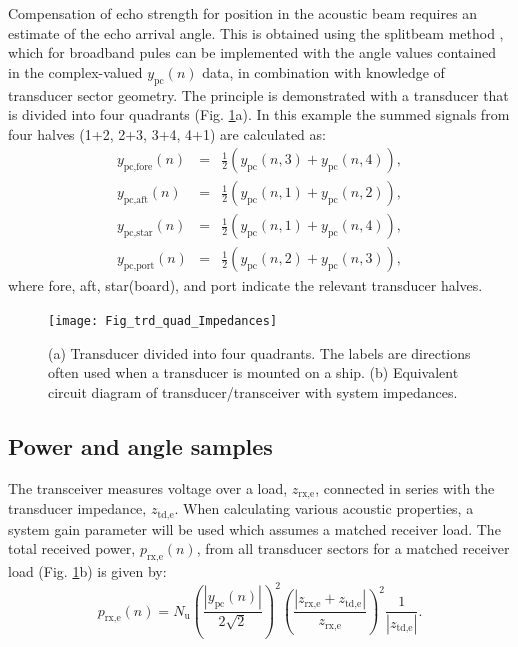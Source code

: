 \documentclass[preprint,12pt,TurnOnLineNumbers]{JASAnew}
\newcommand{\samplesymt}{n}
\newcommand{\nchannels}{N_{\textrm{u}}}
\newcommand{\zrxe}{z_{\textrm{rx,e}}}
\newcommand{\ztde}{z_{\textrm{td,e}}}
\newcommand{\prxe}{p_{\textrm{rx,e}}}
\newcommand{\ypc}{y_{\textrm{pc}}}
\begin{document}
Compensation of echo strength for position in the acoustic beam requires an estimate of the echo arrival angle. This is obtained using the splitbeam method \citep{burdic1991}, which for broadband pules can be implemented with the angle values contained in the complex-valued $\ypc(\samplesymt)$ data, in combination with knowledge of transducer sector geometry. The principle is demonstrated with a transducer that is divided into four quadrants (Fig. \ref{fi:Fig_trd_quad_Impedances}a). In this example the summed signals from four halves (1+2, 2+3, 3+4, 4+1) are calculated as:
\begin{eqnarray}
\label{eq:SumHalves}
y_{\textrm{pc,fore}}(\samplesymt) & = & \frac{1}{2} \left( \ypc(\samplesymt,3)+\ypc(\samplesymt,4) \right),\\
y_{\textrm{pc,aft}}(\samplesymt) & = & \frac{1}{2} \left( \ypc(\samplesymt,1)+\ypc(\samplesymt,2) \right),\\
y_{\textrm{pc,star}}(\samplesymt) & = & \frac{1}{2} \left( \ypc(\samplesymt,1)+\ypc(\samplesymt,4) \right),\\
y_{\textrm{pc,port}}(\samplesymt) & = & \frac{1}{2} \left( \ypc(\samplesymt,2)+\ypc(\samplesymt,3) \right),
\end{eqnarray}
%
where fore, aft, star(board), and port indicate the relevant transducer halves.

\begin{figure}
\texttt{[image: Fig\_trd\_quad\_Impedances]}
\caption{\label{fi:Fig_trd_quad_Impedances}(a) Transducer divided into four quadrants. The labels are directions often used when a transducer is mounted on a ship. (b) Equivalent circuit diagram of transducer/transceiver with system impedances.}
\end{figure}
%

\subsection{Power and angle samples}
The transceiver measures voltage over a load, $\zrxe$, connected in series with the transducer impedance, $\ztde$. When calculating various acoustic properties, a system gain parameter will be used which assumes a matched receiver load. The total received power, $\prxe(\samplesymt)$, from all transducer sectors for a matched receiver load (Fig. \ref{fi:Fig_trd_quad_Impedances}b) is given by: 
\begin{equation}
\label{eq:prx}
\prxe(\samplesymt) = \nchannels\left( \frac{|\ypc(\samplesymt)|}{2\sqrt{2}} \right)^2 \left( \frac{|\zrxe+\ztde|}{\zrxe} \right)^2 \frac{1}{|\ztde|}.
\end{equation}
%
\end{document}
